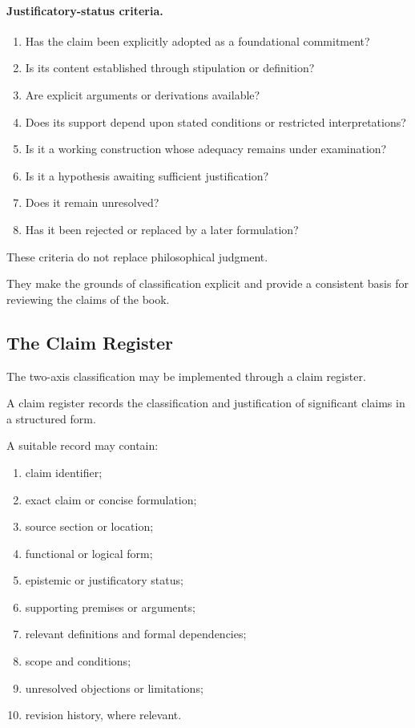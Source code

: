 \paragraph{Justificatory-status criteria.}

\begin{enumerate}
    \item Has the
    claim been
    explicitly adopted
    as a foundational
    commitment?
    \item Is its
    content established
    through stipulation
    or definition?
    \item Are explicit
    arguments or
    derivations available?
    \item Does its
    support depend
    upon stated
    conditions or
    restricted interpretations?
    \item Is it
    a working
    construction
    whose adequacy
    remains under
    examination?
    \item Is it
    a hypothesis
    awaiting sufficient
    justification?
    \item Does it
    remain unresolved?
    \item Has it
    been rejected
    or replaced
    by a
    later formulation?
\end{enumerate}

These criteria
do not replace
philosophical judgment.

They make
the grounds
of classification
explicit and
provide a
consistent basis
for reviewing
the claims
of the book.

\subsection{The Claim Register}

The two-axis
classification
may be implemented
through a claim
register.

A claim
register records
the classification
and justification
of significant
claims in
a structured
form.

A suitable
record may
contain:

\begin{enumerate}
    \item claim identifier;
    \item exact claim
    or concise
    formulation;
    \item source section
    or location;
    \item functional
    or logical
    form;
    \item epistemic
    or justificatory
    status;
    \item supporting
    premises or
    arguments;
    \item relevant
    definitions and
    formal dependencies;
    \item scope and
    conditions;
    \item unresolved
    objections or
    limitations;
    \item revision
    history, where
    relevant.
\end{enumerate}

